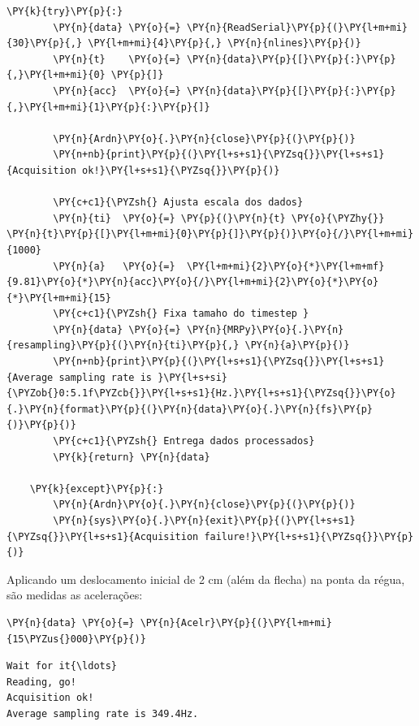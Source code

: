 \begin{tcolorbox}[breakable, size=fbox, boxrule=1pt, pad at break*=1mm,colback=cellbackground, colframe=cellborder]
\begin{Verbatim}[commandchars=\\\{\}]
    \PY{k}{try}\PY{p}{:}
        \PY{n}{data} \PY{o}{=} \PY{n}{ReadSerial}\PY{p}{(}\PY{l+m+mi}{30}\PY{p}{,} \PY{l+m+mi}{4}\PY{p}{,} \PY{n}{nlines}\PY{p}{)}
        \PY{n}{t}    \PY{o}{=} \PY{n}{data}\PY{p}{[}\PY{p}{:}\PY{p}{,}\PY{l+m+mi}{0} \PY{p}{]}
        \PY{n}{acc}  \PY{o}{=} \PY{n}{data}\PY{p}{[}\PY{p}{:}\PY{p}{,}\PY{l+m+mi}{1}\PY{p}{:}\PY{p}{]}

        \PY{n}{Ardn}\PY{o}{.}\PY{n}{close}\PY{p}{(}\PY{p}{)}
        \PY{n+nb}{print}\PY{p}{(}\PY{l+s+s1}{\PYZsq{}}\PY{l+s+s1}{Acquisition ok!}\PY{l+s+s1}{\PYZsq{}}\PY{p}{)}
        
        \PY{c+c1}{\PYZsh{} Ajusta escala dos dados}
        \PY{n}{ti}  \PY{o}{=} \PY{p}{(}\PY{n}{t} \PY{o}{\PYZhy{}} \PY{n}{t}\PY{p}{[}\PY{l+m+mi}{0}\PY{p}{]}\PY{p}{)}\PY{o}{/}\PY{l+m+mi}{1000}
        \PY{n}{a}   \PY{o}{=}  \PY{l+m+mi}{2}\PY{o}{*}\PY{l+m+mf}{9.81}\PY{o}{*}\PY{n}{acc}\PY{o}{/}\PY{l+m+mi}{2}\PY{o}{*}\PY{o}{*}\PY{l+m+mi}{15}
        \PY{c+c1}{\PYZsh{} Fixa tamaho do timestep }
        \PY{n}{data} \PY{o}{=} \PY{n}{MRPy}\PY{o}{.}\PY{n}{resampling}\PY{p}{(}\PY{n}{ti}\PY{p}{,} \PY{n}{a}\PY{p}{)}
        \PY{n+nb}{print}\PY{p}{(}\PY{l+s+s1}{\PYZsq{}}\PY{l+s+s1}{Average sampling rate is }\PY{l+s+si}{\PYZob{}0:5.1f\PYZcb{}}\PY{l+s+s1}{Hz.}\PY{l+s+s1}{\PYZsq{}}\PY{o}{.}\PY{n}{format}\PY{p}{(}\PY{n}{data}\PY{o}{.}\PY{n}{fs}\PY{p}{)}\PY{p}{)}
        \PY{c+c1}{\PYZsh{} Entrega dados processados}
        \PY{k}{return} \PY{n}{data}
        
    \PY{k}{except}\PY{p}{:}
        \PY{n}{Ardn}\PY{o}{.}\PY{n}{close}\PY{p}{(}\PY{p}{)}
        \PY{n}{sys}\PY{o}{.}\PY{n}{exit}\PY{p}{(}\PY{l+s+s1}{\PYZsq{}}\PY{l+s+s1}{Acquisition failure!}\PY{l+s+s1}{\PYZsq{}}\PY{p}{)}
\end{Verbatim}
\end{tcolorbox}

    Aplicando um deslocamento inicial de 2 cm (além da flecha) na ponta da
régua, são medidas as acelerações:

    \begin{tcolorbox}[breakable, size=fbox, boxrule=1pt, pad at break*=1mm,colback=cellbackground, colframe=cellborder]
\begin{Verbatim}[commandchars=\\\{\}]
\PY{n}{data} \PY{o}{=} \PY{n}{Acelr}\PY{p}{(}\PY{l+m+mi}{15\PYZus{}000}\PY{p}{)}
\end{Verbatim}
\end{tcolorbox}

    \begin{Verbatim}[commandchars=\\\{\}]
Wait for it{\ldots}
Reading, go!
Acquisition ok!
Average sampling rate is 349.4Hz.
    \end{Verbatim}

